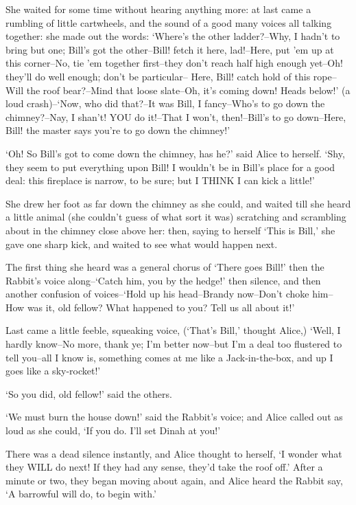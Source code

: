 \documentclass[12pt]{book}
\begin{document}
  She waited for some time without hearing anything more:  at
last came a rumbling of little cartwheels, and the sound of a
good many voices all talking together:  she made out the words:
`Where's the other ladder?--Why, I hadn't to bring but one;
Bill's got the other--Bill! fetch it here, lad!--Here, put 'em up
at this corner--No, tie 'em together first--they don't reach half
high enough yet--Oh! they'll do well enough; don't be particular--
Here, Bill! catch hold of this rope--Will the roof bear?--Mind
that loose slate--Oh, it's coming down!  Heads below!' (a loud
crash)--`Now, who did that?--It was Bill, I fancy--Who's to go
down the chimney?--Nay, I shan't! YOU do it!--That I won't,
then!--Bill's to go down--Here, Bill! the master says you're to
go down the chimney!'

  `Oh! So Bill's got to come down the chimney, has he?' said
Alice to herself.  `Shy, they seem to put everything upon Bill!
I wouldn't be in Bill's place for a good deal:  this fireplace is
narrow, to be sure; but I THINK I can kick a little!'

  She drew her foot as far down the chimney as she could, and
waited till she heard a little animal (she couldn't guess of what
sort it was) scratching and scrambling about in the chimney close
above her:  then, saying to herself `This is Bill,' she gave one
sharp kick, and waited to see what would happen next.

  The first thing she heard was a general chorus of `There goes
Bill!' then the Rabbit's voice along--`Catch him, you by the
hedge!' then silence, and then another confusion of voices--`Hold
up his head--Brandy now--Don't choke him--How was it, old fellow?
What happened to you?  Tell us all about it!'

  Last came a little feeble, squeaking voice, (`That's Bill,'
thought Alice,) `Well, I hardly know--No more, thank ye; I'm
better now--but I'm a deal too flustered to tell you--all I know
is, something comes at me like a Jack-in-the-box, and up I goes
like a sky-rocket!'

  `So you did, old fellow!' said the others.

  `We must burn the house down!' said the Rabbit's voice; and
Alice called out as loud as she could, `If you do.  I'll set
Dinah at you!'

  There was a dead silence instantly, and Alice thought to
herself, `I wonder what they WILL do next!  If they had any
sense, they'd take the roof off.'  After a minute or two, they
began moving about again, and Alice heard the Rabbit say, `A
barrowful will do, to begin with.'
\end{document}
